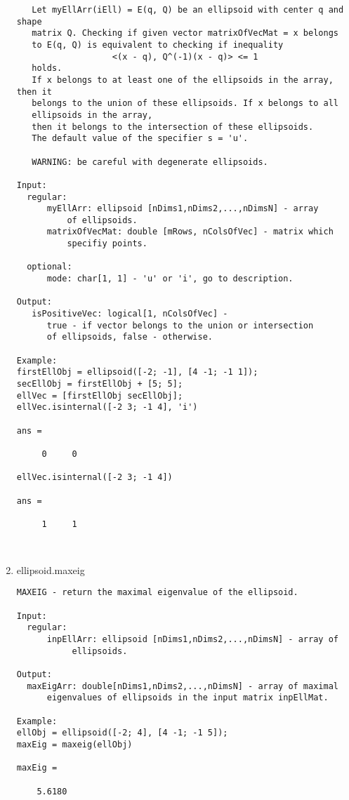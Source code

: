 \begin{enumerate}
\begin{lstlisting}
   Let myEllArr(iEll) = E(q, Q) be an ellipsoid with center q and shape
   matrix Q. Checking if given vector matrixOfVecMat = x belongs
   to E(q, Q) is equivalent to checking if inequality
                   <(x - q), Q^(-1)(x - q)> <= 1
   holds.
   If x belongs to at least one of the ellipsoids in the array, then it
   belongs to the union of these ellipsoids. If x belongs to all
   ellipsoids in the array,
   then it belongs to the intersection of these ellipsoids.
   The default value of the specifier s = 'u'.

   WARNING: be careful with degenerate ellipsoids.

Input:
  regular:
      myEllArr: ellipsoid [nDims1,nDims2,...,nDimsN] - array
          of ellipsoids.
      matrixOfVecMat: double [mRows, nColsOfVec] - matrix which
          specifiy points.

  optional:
      mode: char[1, 1] - 'u' or 'i', go to description.

Output:
   isPositiveVec: logical[1, nColsOfVec] -
      true - if vector belongs to the union or intersection
      of ellipsoids, false - otherwise.

Example:
firstEllObj = ellipsoid([-2; -1], [4 -1; -1 1]);
secEllObj = firstEllObj + [5; 5];
ellVec = [firstEllObj secEllObj];
ellVec.isinternal([-2 3; -1 4], 'i')

ans =

     0     0

ellVec.isinternal([-2 3; -1 4])

ans =

     1     1



\end{lstlisting}
\fontfamily{\familydefault}
\selectfont
\item {ellipsoid.maxeig}
\selectfont
\begin{lstlisting}
MAXEIG - return the maximal eigenvalue of the ellipsoid.

Input:
  regular:
      inpEllArr: ellipsoid [nDims1,nDims2,...,nDimsN] - array of
           ellipsoids.

Output:
  maxEigArr: double[nDims1,nDims2,...,nDimsN] - array of maximal
      eigenvalues of ellipsoids in the input matrix inpEllMat.

Example:
ellObj = ellipsoid([-2; 4], [4 -1; -1 5]);
maxEig = maxeig(ellObj)

maxEig =

    5.6180




\end{lstlisting}
\end{enumerate}
